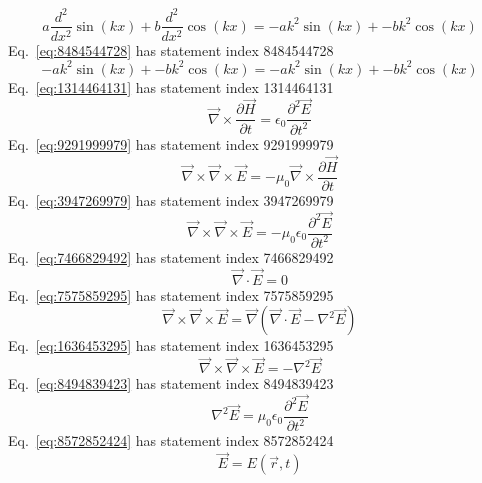 \documentclass[12pt]{report}
\begin{document}
\begin{equation}
a \frac{d^2}{dx^2}\sin(kx) + b \frac{d^2}{dx^2}\cos(k x) = -a k^2 \sin(kx) + -b k^2 \cos(kx)
\label{eq:8485757728}
\end{equation}
Eq.~\ref{eq:8484544728} has statement index 8484544728
\begin{equation}
-a k^2\sin(k x) + -b k^2\cos(k x) = -a k^2 \sin(kx) + -b k^2 \cos(k x)
\label{eq:8484544728}
\end{equation}
Eq.~\ref{eq:1314464131} has statement index 1314464131
\begin{equation}
\vec{\nabla} \times \frac{\partial \vec{H}}{\partial t} = \epsilon_0 \frac{\partial^2 \vec{E}}{\partial t^2}
\label{eq:1314464131}
\end{equation}
Eq.~\ref{eq:9291999979} has statement index 9291999979
\begin{equation}
\vec{\nabla} \times \vec{\nabla} \times \vec{E} = -\mu_0\vec{\nabla} \times \frac{\partial \vec{H}}{\partial t}
\label{eq:9291999979}
\end{equation}
Eq.~\ref{eq:3947269979} has statement index 3947269979
\begin{equation}
\vec{\nabla} \times \vec{\nabla} \times \vec{E} = -\mu_0 \epsilon_0 \frac{\partial^2 \vec{E}}{\partial t^2}
\label{eq:3947269979}
\end{equation}
Eq.~\ref{eq:7466829492} has statement index 7466829492
\begin{equation}
\vec{\nabla} \cdot \vec{E} = 0
\label{eq:7466829492}
\end{equation}
Eq.~\ref{eq:7575859295} has statement index 7575859295
\begin{equation}
\vec{\nabla} \times \vec{\nabla} \times \vec{E} = \vec{\nabla}(\vec{\nabla} \cdot \vec{E} - \nabla^2 \vec{E})
\label{eq:7575859295}
\end{equation}
Eq.~\ref{eq:1636453295} has statement index 1636453295
\begin{equation}
\vec{\nabla} \times \vec{\nabla} \times \vec{E} =  - \nabla^2 \vec{E}
\label{eq:1636453295}
\end{equation}
Eq.~\ref{eq:8494839423} has statement index 8494839423
\begin{equation}
\nabla^2 \vec{E}= \mu_0 \epsilon_0 \frac{\partial^2 \vec{E}}{\partial t^2}
\label{eq:8494839423}
\end{equation}
Eq.~\ref{eq:8572852424} has statement index 8572852424
\begin{equation}
\vec{E}= E(\vec{r},t)
\label{eq:8572852424}
\end{equation}
\end{document}
